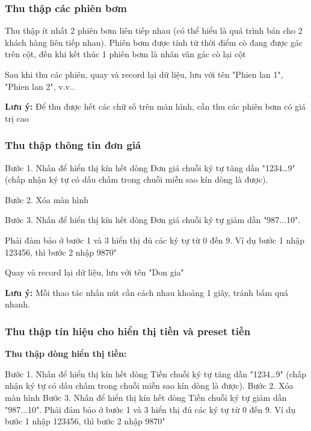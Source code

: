 \subsubsection{Thu thập các phiên bơm}

Thu thập ít nhất 2 phiên bơm liên tiếp nhau (có thể hiểu là quá trình bán cho 2 khách hàng liên tiếp nhau). Phiên bơm được tính từ thời điểm cò đang được gác trên cột, đến khi kết thúc 1 phiên bơm là nhân vân gác cò lại cột

Sau khi thu các phiên, quay và record lại dữ liệu, lưu với tên "Phien lan 1", "Phien lan 2", v.v..

\textbf{Lưu ý:
}Để thu được hết các chữ số trên màn hình, cần thu các phiên bơm có giá trị cao

\subsubsection{Thu thập thông tin đơn giá}

\hspace{0.8cm}Bước 1. Nhấn để hiển thị kín hết dòng Đơn giá  chuỗi ký tự tăng dần "1234…9" (chấp nhận ký tự có dấu chấm trong chuỗi miễn sao kín dòng là được).

Bước 2. Xóa màn hình

Bước 3. Nhấn để hiển thị kín hết dòng Đơn giá chuỗi ký tự giảm dần "987...10".

Phải đảm bảo ở bước 1 và 3 hiển thị đủ các ký tự từ 0 đến 9. Ví dụ bước 1 nhập 123456, thì bước 2 nhập 9870"

Quay và record lại dữ liệu, lưu với tên "Don gia"

\textbf{Lưu ý:} Mỗi thao tác nhấn nút cần cách nhau khoảng 1 giây, tránh bấm quá nhanh.

\subsubsection{Thu thập tín hiệu cho hiển thị tiền và preset tiền}

\hspace{0.8cm}\textbf{Thu thập dòng hiển thị tiền:}

Bước 1. Nhấn để hiển thị kín hết dòng Tiền chuỗi ký tự tăng dần "1234…9" (chấp nhận ký tự có dấu chấm trong chuỗi miễn sao kín dòng là được).
Bước 2. Xóa màn hình
Bước 3. Nhấn để hiển thị kín hết dòng Tiền chuỗi ký tự giảm dần "987...10".
Phải đảm bảo ở bước 1 và 3 hiển thị đủ các ký tự từ 0 đến 9. Ví dụ bước 1 nhập 123456, thì bước 2 nhập 9870"

